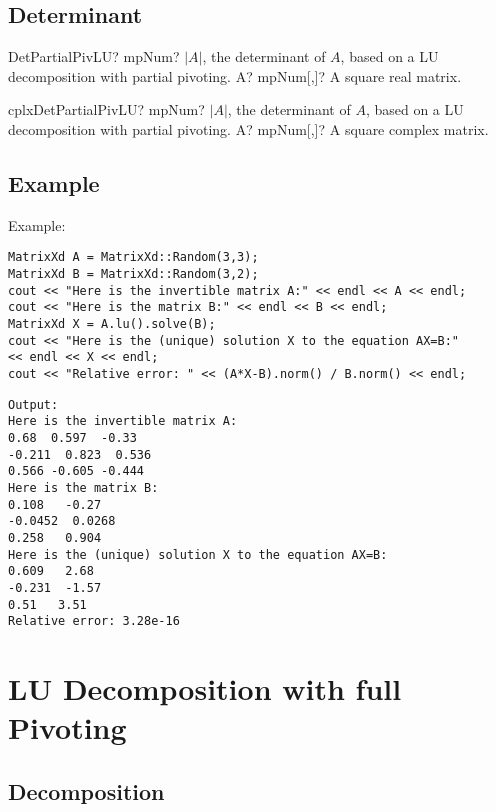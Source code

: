 \subsection{Determinant}

\begin{mpFunctionsExtract}
	\mpFunctionOne
	{DetPartialPivLU? mpNum? $|A|$, the determinant of $A$, based on a LU decomposition with partial pivoting.}
	{A? mpNum[,]? A square real matrix.}
\end{mpFunctionsExtract}

\vspace{0.6cm}
\begin{mpFunctionsExtract}
	\mpFunctionOne
	{cplxDetPartialPivLU? mpNum? $|A|$, the determinant of $A$, based on a LU decomposition with partial pivoting.}
	{A? mpNum[,]? A square complex matrix.}
\end{mpFunctionsExtract}




\subsection{Example}
Example:

\begin{lstlisting}
MatrixXd A = MatrixXd::Random(3,3);
MatrixXd B = MatrixXd::Random(3,2);
cout << "Here is the invertible matrix A:" << endl << A << endl;
cout << "Here is the matrix B:" << endl << B << endl;
MatrixXd X = A.lu().solve(B);
cout << "Here is the (unique) solution X to the equation AX=B:" 
<< endl << X << endl;
cout << "Relative error: " << (A*X-B).norm() / B.norm() << endl;
\end{lstlisting}

\begin{verbatim}
Output:
Here is the invertible matrix A:
0.68  0.597  -0.33
-0.211  0.823  0.536
0.566 -0.605 -0.444
Here is the matrix B:
0.108   -0.27
-0.0452  0.0268
0.258   0.904
Here is the (unique) solution X to the equation AX=B:
0.609   2.68
-0.231  -1.57
0.51   3.51
Relative error: 3.28e-16
\end{verbatim}


\newpage
\section{LU Decomposition with full Pivoting}
\label{LU Decomposition with full Pivoting}



\subsection{Decomposition}

